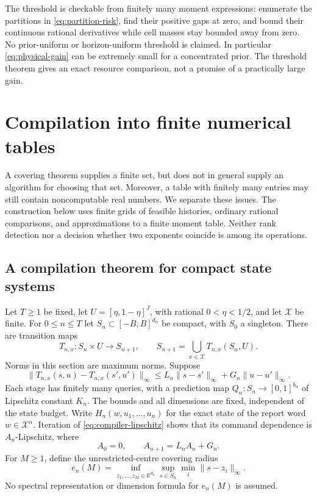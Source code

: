 \documentclass[11pt]{amsart}
\theoremstyle{definition}\newtheorem{definition}[theorem]{Definition}
\theoremstyle{remark}\newtheorem{remark}[theorem]{Remark}
\begin{document}
The threshold is checkable from finitely many moment expressions: enumerate
the partitions in \eqref{eq:partition-risk}, find their positive gaps at
zero, and bound their continuous rational derivatives while cell masses
stay bounded away from zero. No prior-uniform or horizon-uniform threshold
is claimed. In particular \eqref{eq:physical-gain} can be extremely small
for a concentrated prior. The threshold theorem gives an exact resource
comparison, not a promise of a practically large gain.

\section{Compilation into finite numerical tables}\label{sec:effective}
A covering theorem supplies a finite set, but does not in general supply
an algorithm for choosing that set. Moreover, a table with finitely many
entries may still contain noncomputable real numbers. We separate these
issues. The construction below uses finite grids of feasible histories,
ordinary rational comparisons, and approximations to a finite moment
table. Neither rank detection nor a decision whether two exponents
coincide is among its operations.

\subsection{A compilation theorem for compact state systems}
Let $T\ge1$ be fixed, let $U=[\eta,1-\eta]^J$, with rational
$0<\eta<1/2$, and let $\mathcal X$ be finite. For $0\le n\le T$
let $S_n\subset[-B,B]^{d_n}$ be compact, with $S_0$ a singleton.
There are transition maps
\[
 T_{n,x}:S_n\times U\longrightarrow S_{n+1},\qquad
 S_{n+1}=\bigcup_{x\in\mathcal X}T_{n,x}(S_n,U).
\]
Norms in this section are maximum norms. Suppose
\begin{equation}\label{eq:compiler-lipschitz}
 \|T_{n,x}(s,u)-T_{n,x}(s',u')\|_\infty
 \le L_n\|s-s'\|_\infty+G_n\|u-u'\|_\infty.
\end{equation}
Each stage has finitely many queries, with a prediction map
$Q_n:S_n\to[0,1]^{b_n}$ of Lipschitz constant $K_n$.
The bounds and all dimensions are fixed, independent of the state budget.
Write $H_n(w,u_1,\ldots,u_n)$ for the exact state of the report word
$w\in\mathcal X^n$. Iteration of \eqref{eq:compiler-lipschitz} shows that
its command dependence is $A_n$-Lipschitz, where
\[
 A_0=0,\qquad A_{n+1}=L_nA_n+G_n.
\]
For $M\ge1$, define the unrestricted-centre covering radius
\[
 e_n(M)=\inf_{z_1,\ldots,z_M\in\mathbb R^{d_n}}
                  \sup_{s\in S_n}\min_i\|s-z_i\|_\infty.
\]
No spectral representation or dimension formula for $e_n(M)$ is assumed.
\end{document}
